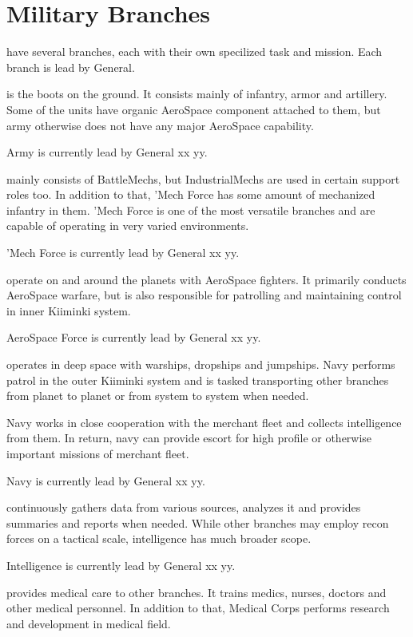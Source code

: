\documentclass{tufte-book}
\begin{document}
\section{Military Branches}
\label{sc:military_branches}

 have several branches, each with their own
specilized task and mission. Each branch is lead by General.

 is the boots on the ground. It consists mainly of infantry,
armor and artillery. Some of the units have organic AeroSpace component
attached to them, but army otherwise does not have any major AeroSpace
capability.

Army is currently lead by General xx yy.

 mainly consists of BattleMechs, but IndustrialMechs
are used in certain support roles too. In addition to that, 'Mech Force has
some amount of mechanized infantry in them. 'Mech Force is one of the most
versatile branches and are capable of operating in very varied environments.

'Mech Force is currently lead by General xx yy.

 operate on and around the planets with AeroSpace
fighters. It primarily conducts AeroSpace warfare, but is also responsible for
patrolling and maintaining control in inner Kiiminki system.

AeroSpace Force is currently lead by General xx yy.

 operates in deep space with warships, dropships and
jumpships. Navy performs patrol in the outer Kiiminki system and is tasked
transporting other branches from planet to planet or from system to system
when needed.

Navy works in close cooperation with the merchant fleet and collects
intelligence from them. In return, navy can provide escort for high profile
or otherwise important missions of merchant fleet.

Navy is currently lead by General xx yy.

 continuously gathers data from various sources,
analyzes it and provides summaries and reports when needed. While other
branches may employ recon forces on a tactical scale, intelligence has much
broader scope.

Intelligence is currently lead by General xx yy.

 provides medical care to other branches. It trains
medics, nurses, doctors and other medical personnel. In addition to that,
Medical Corps performs research and development in medical field.
\end{document}
